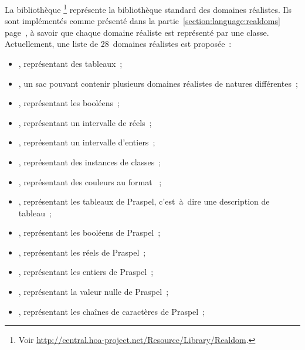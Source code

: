 \subsubsection{}

La bibliothèque \footnote{Voir
\url{http://central.hoa-project.net/Resource/Library/Realdom}.} représente la
bibliothèque standard des domaines réalistes. Ils sont implémentés comme
présenté dans la partie~\ref{section:language:realdoms}
page~\pageref{section:language:realdoms}, à savoir que chaque domaine réaliste
est représenté par une classe.  Actuellement, une liste de 28~domaines réalistes
est proposée~:
%
\begin{itemize}

\item {}, représentant des tableaux~;

\item {}, un sac pouvant contenir plusieurs domaines réalistes de
natures différentes~;

\item {}, représentant les booléens~;

\item {}, représentant un intervalle de réels~;

\item {}, représentant un intervalle d'entiers~;

\item {}, représentant des instances de classes~;

\item {}, représentant des couleurs au format ~;

\item {}, représentant les tableaux de Praspel, c'est~à~dire une
description de tableau~;

\item {}, représentant les booléens de Praspel~;

\item {}, représentant les réels de Praspel~;

\item {}, représentant les entiers de Praspel~;

\item {}, représentant la valeur nulle de Praspel~;

\item {}, représentant les chaînes de caractères de Praspel~;


\end{itemize}
